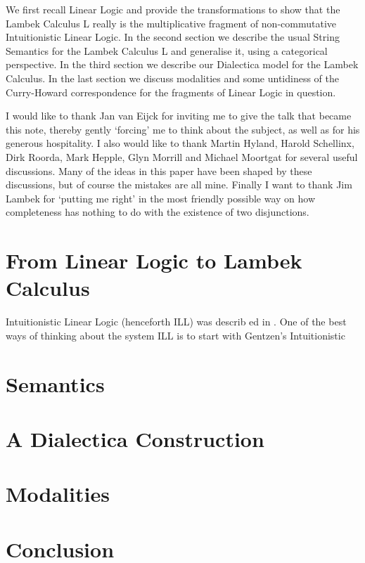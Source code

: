 \documentclass{article}
\begin{document}
We first recall Linear Logic and provide the transformations to show that the Lambek Calculus \textsf{L} really is the multiplicative fragment of non-commutative Intuitionistic Linear Logic. In the second section we describe the usual String Semantics for the Lambek Calculus \textsf{L} and generalise it, using a categorical perspective. In the third section we describe our Dialectica model for the Lambek Calculus. In the last section we discuss modalities and some untidiness of the Curry-Howard correspondence for the fragments of Linear Logic in question.

 I would like to thank Jan van Eijck for inviting me to give the talk that became
this note, thereby gently `forcing' me to think about the subject, as well as for his
generous hospitality. I also would like to thank Martin Hyland, Harold Schellinx,
Dirk Roorda, Mark Hepple, Glyn Morrill and Michael Moortgat for several useful
discussions. Many of the ideas in this paper have been shaped by these discussions,
but of course the mistakes are all mine. Finally I want to thank Jim Lambek for     `putting me right'
 in the most friendly possible way on how completeness has nothing to do with the existence of two disjunctions.

\section{From Linear Logic to Lambek Calculus}
Intuitionistic Linear Logic (henceforth \textsf{ILL}) was describ ed in \cite{girard1987}. One of the best ways of thinking about the system ILL is to start with Gentzen's Intuitionistic 

\section{Semantics}

\section{A Dialectica Construction}

\section{Modalities}
\section{Conclusion}




\end{document}
